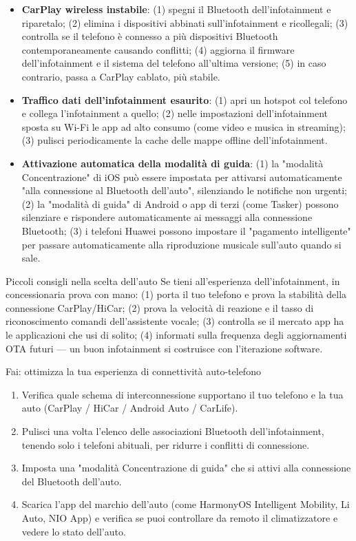 \begin{itemize}
  \item \textbf{CarPlay wireless instabile}: (1) spegni il Bluetooth dell'infotainment e riparetalo; (2) elimina i dispositivi abbinati sull'infotainment e ricollegali; (3) controlla se il telefono è connesso a più dispositivi Bluetooth contemporaneamente causando conflitti; (4) aggiorna il firmware dell'infotainment e il sistema del telefono all'ultima versione; (5) in caso contrario, passa a CarPlay cablato, più stabile.
  \item \textbf{Traffico dati dell'infotainment esaurito}: (1) apri un hotspot col telefono e collega l'infotainment a quello; (2) nelle impostazioni dell'infotainment sposta su Wi-Fi le app ad alto consumo (come video e musica in streaming); (3) pulisci periodicamente la cache delle mappe offline dell'infotainment.
  \item \textbf{Attivazione automatica della modalità di guida}: (1) la "modalità Concentrazione" di iOS può essere impostata per attivarsi automaticamente "alla connessione al Bluetooth dell'auto", silenziando le notifiche non urgenti; (2) la "modalità di guida" di Android o app di terzi (come Tasker) possono silenziare e rispondere automaticamente ai messaggi alla connessione Bluetooth; (3) i telefoni Huawei possono impostare il "pagamento intelligente" per passare automaticamente alla riproduzione musicale sull'auto quando si sale.
\end{itemize}

\begin{tcbinfo}{Piccoli consigli nella scelta dell'auto}
Se tieni all'esperienza dell'infotainment, in concessionaria prova con mano: (1) porta il tuo telefono e prova la stabilità della connessione CarPlay/HiCar; (2) prova la velocità di reazione e il tasso di riconoscimento comandi dell'assistente vocale; (3) controlla se il mercato app ha le applicazioni che usi di solito; (4) informati sulla frequenza degli aggiornamenti OTA futuri — un buon infotainment si costruisce con l'iterazione software.

\end{tcbinfo}

\begin{tcbpractice}{Fai: ottimizza la tua esperienza di connettività auto-telefono}
\begin{enumerate}
  \item Verifica quale schema di interconnessione supportano il tuo telefono e la tua auto (CarPlay / HiCar / Android Auto / CarLife).
  \item Pulisci una volta l'elenco delle associazioni Bluetooth dell'infotainment, tenendo solo i telefoni abituali, per ridurre i conflitti di connessione.
  \item Imposta una "modalità Concentrazione di guida" che si attivi alla connessione del Bluetooth dell'auto.
  \item Scarica l'app del marchio dell'auto (come HarmonyOS Intelligent Mobility, Li Auto, NIO App) e verifica se puoi controllare da remoto il climatizzatore e vedere lo stato dell'auto.
\end{enumerate}

\end{tcbpractice}

